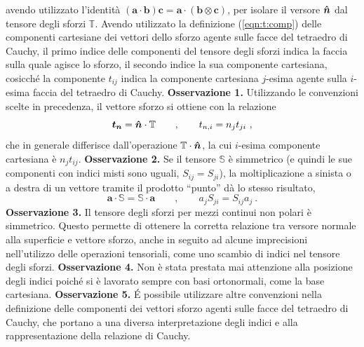avendo utilizzato l'identità $(\bm{a} \cdot \bm{b})\bm{c} = \bm{a} \cdot (\bm{b}\otimes\bm{c})$, per isolare il versore $\bm{\hat{n}}$ dal tensore degli sforzi $\mathbb{T}$. Avendo utilizzato la definizione (\ref{eqn:t:comp}) delle componenti cartesiane dei vettori dello sforzo agente sulle facce del tetraedro di Cauchy, il primo indice delle componenti del tensore degli sforzi indica la faccia sulla quale agisce lo sforzo, il secondo indice la sua componente cartesiana, cosicché la componente $t_{ij}$ indica la componente cartesiana $j$-esima agente sulla $i$-esima faccia del tetraedro di Cauchy.
%
\newline \noindent
\textbf{Osservazione 1.} Utilizzando le convenzioni scelte in precedenza, il vettore sforzo si ottiene con la relazione
\begin{equation}
 \bm{t_n} = \bm{\hat{n}} \cdot \mathbb{T} \qquad , \qquad t_{n,i} = n_j t_{ji} \ ,
\end{equation}
che in generale differisce dall'operazione $\mathbb{T} \cdot \bm{\hat{n}}$, la cui $i$-esima componente cartesiana è $n_j t_{ij}$.
%
\newline \noindent
\textbf{Osservazione 2.} Se il tensore $\mathbb{S}$ è simmetrico (e quindi le sue componenti con indici misti sono uguali, $S_{ij} = S_{ji}$), la moltiplicazione a sinista o a destra di un vettore tramite il prodotto ``punto'' dà lo stesso risultato,
\begin{equation}
 \bm{a} \cdot \mathbb{S} = \mathbb{S} \cdot \bm{a} \qquad , \qquad 
 a_j S_{ji} = S_{ij} a_j \ .
\end{equation}
%
\newline \noindent
\textbf{Osservazione 3.} Il tensore degli sforzi per mezzi continui non polari è simmetrico. Questo permette di ottenere la corretta relazione tra versore normale alla superficie e vettore sforzo, anche in seguito ad alcune imprecisioni nell'utilizzo delle operazioni tensoriali, come uno scambio di indici nel tensore degli sforzi.
%
\newline \noindent
\textbf{Osservazione 4.} Non è stata prestata mai attenzione alla posizione degli indici poiché si è lavorato sempre con basi ortonormali, come la base cartesiana.
%
\newline \noindent
\textbf{Osservazione 5.} \'E possibile utilizzare altre convenzioni nella definizione delle componenti dei vettori sforzo agenti sulle facce del tetraedro di Cauchy, che portano a una diversa interpretazione degli indici e alla rappresentazione della relazione di Cauchy.




